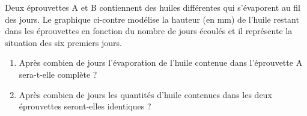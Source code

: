 %
%
    \parbox[c]{.5\linewidth}{Deux éprouvettes A et B contiennent des huiles différentes qui s'évaporent au fil des jours.
    Le graphique ci-contre modélise la hauteur (en mm) de l'huile restant dans les éprouvettes en fonction du nombre de jours écoulés et il représente la situation des six premiers jours.}
    \hfil
    
    \begin{enumerate}
        \item Après combien de jours l'évaporation de l'huile contenue dans l'éprouvette A sera-t-elle complète ?
        \item Après combien de jours les quantités d'huile contenues dans les deux éprouvettes seront-elles identiques ?
    \end{enumerate}
